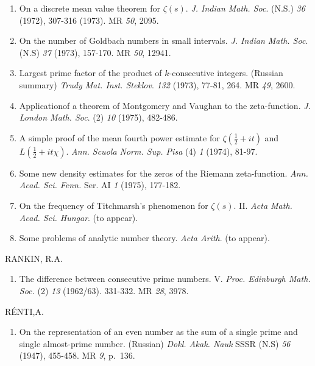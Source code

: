 \begin{thebibliography}{99}
\begin{enumerate}
\item On a discrete mean value theorem for
  $\zeta(s)$. \textit{J. Indian Math. Soc}. (N.S.) {\em 36} (1972),
  307-316 (1973). MR {\em 50}, 2095. 

\item On the number of Goldbach numbers in small
  intervals. \textit{J. Indian Math. Soc}. (N.S) {\em 37} (1973), 157-170. MR
  {\em 50}, 12941. 

\item Largest prime factor of the product of $k$-consecutive
  integers. (Russian summary) \textit{Trudy
    Mat. Inst. Steklov}. {\em 132} (1973), 77-81, 264. MR {\em 49},
  2600.  

\item Application\pageoriginale of a theorem of Montgomery and Vaughan
  to the zeta-function. \textit{J. London Math. Soc}. (2) {\em 10}
  (1975), 482-486. 

\item A simple proof of the mean fourth power estimate for $\zeta
  (\frac{1}{2} + it)$ and $ L(\frac{1}{2} + it \chi)$. 
\textit{Ann. Scuola Norm. Sup. Pisa} (4) {\em 1} (1974), 81-97. 

\item Some new density estimates for the zeros of the Riemann
  zeta-function. \textit{Ann. Acad. Sci. Fenn.} Ser. AI
  {\em 1} (1975), 177-182. 

\item On the frequency of Titchmarsh's phenomenon for
  $\zeta(s)$. II. \textit{Acta Math. Acad. Sci. Hungar}. (to appear). 

\item Some problems of analytic number theory. \textit{Acta
  Arith}. (to appear). 
\end{enumerate}

 RANKIN, R.A.
\begin{enumerate}
\item The difference between consecutive prime
  numbers. V. \textit{Proc. Edinburgh Math. Soc.} (2) {\em 13}
  (1962/63). 331-332. MR {\em 28}, 3978.
\end{enumerate}

 R\'ENTI,A.
\begin{enumerate}
\item On the representation of an even number as the sum of a single
  prime and single almost-prime number. (Russian)
  \textit{Dokl. Akak. Nauk} SSSR (N.S) {\em 56} (1947), 455-458. MR
         {\em 9}, p.~136.


\end{enumerate}
\end{thebibliography}
